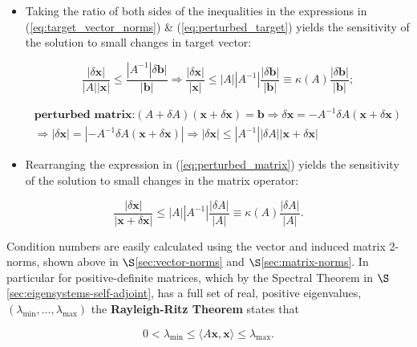 \documentclass[12pt, twoside, draft]{article}
\begin{document}
\begin{itemize}
\item Taking the ratio of both sides of the inequalities in the expressions in (\ref{eq:target_vector_norms}) \& (\ref{eq:perturbed_target}) yields the sensitivity of the solution to small changes in target vector:

\begin{equation}\label{eq:target_sensitivity}
\frac{|\delta \mathbf{x}|}{|A||\mathbf{x}|} \leq \frac{|A^{-1}|\delta \mathbf{b}|}{| \mathbf{b}|} \Rightarrow \frac{|\delta \mathbf{x}|}{|\mathbf{x}|} \leq |A||A^{-1}| \frac{|\delta \mathbf{b}|}{|\mathbf{b}|} \equiv \kappa(A) \frac{|\delta \mathbf{b}|}{|\mathbf{b}|};
\end{equation}

\begin{multline}\label{eq:perturbed_matrix}
\textbf{perturbed matrix:} \left( A + \delta A \right) \left( \mathbf{x} + \delta \mathbf{x} \right) = \mathbf{b} \Rightarrow \delta \mathbf{x} = -A^{-1} \delta A \left( \mathbf{x} + \delta \mathbf{x} \right)  \\
\Rightarrow |\delta \mathbf{x} | = |-A^{-1} \delta A \left( \mathbf{x} + \delta \mathbf{x} \right) | \Rightarrow |\delta \mathbf{x}| \leq |A^{-1}||\delta A||\mathbf{x} + \delta \mathbf{x} |
\end{multline}

\item Rearranging the expression in (\ref{eq:perturbed_matrix}) yields the sensitivity of the solution to small changes in the matrix operator:
\end{itemize}
\begin{equation}\label{eq:matrix_sensitivity}
\frac{|\delta \mathbf{x} |}{|\mathbf{x} + \delta \mathbf{x}|} \leq |A||A^{-1}| \frac{|\delta A|}{|A|} \equiv \kappa(A) \frac{|\delta A|}{|A|}.
\end{equation}

Condition numbers are easily calculated using the vector and induced matrix 2-norms, shown above in $\S$\ref{sec:vector-norms} and $\S$\ref{sec:matrix-norms}.  In particular for positive-definite matrices, which by the Spectral Theorem in $\S$\ref{sec:eigensystems-self-adjoint}, has a full set of real, positive eigenvalues, $(\lambda_{\min}, \ldots, \lambda_{\max})$ the \textbf{Rayleigh-Ritz Theorem} states that

\begin{equation}\label{eq:Rayleigh-Ritz_theorem}
0 < \lambda_{\min} \leq \langle A \mathbf{x}, \mathbf{x} \rangle \leq \lambda_{\max}.
\end{equation}
\end{document}

